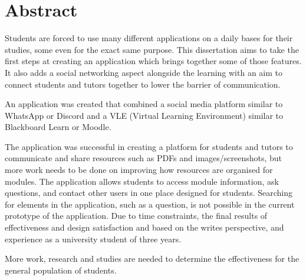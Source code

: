\chapter*{Abstract}

Students are forced to use many different applications on a daily bases for their studies, some even for the exact same purpose. This dissertation aims to take the first steps at creating an application which brings together some of those features. It also adds a social networking aspect alongside the learning with an aim to connect students and tutors together to lower the barrier of communication.

An application was created that combined a social media platform similar to WhatsApp or Discord and a VLE (Virtual Learning Environment) similar to Blackboard Learn or Moodle. 

The application was successful in creating a platform for students and tutors to communicate and share resources such as PDFs and images/screenshots, but more work needs to be done on improving how resources are organised for modules. The application allows students to access module information, ask questions, and contact other users in one place designed for students. Searching for elements in the application, such as a question, is not possible in the current prototype of the application.
Due to time constraints, the final results of effectiveness and design satisfaction and based on the writes perspective, and experience as a university student of three years.

More work, research and studies are needed to determine the effectiveness for the general population of students.